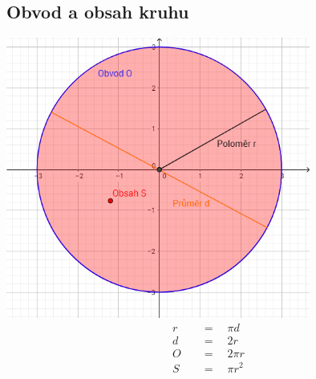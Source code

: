 \documentclass[12pt]{article}
\begin{document}
\subsection{Obvod a obsah kruhu}
\includegraphics[width=10cm]{Circle.png}
\begin{equation}
\begin{split}
r\quad &=\quad \pi d\nonumber\\ 
d\quad &=\quad 2r\nonumber\\
O\quad &=\quad 2\pi\nonumber r\\
S\quad &=\quad \pi { r }^{ 2 }\nonumber
\end{split}
\end{equation}
\end{document}
